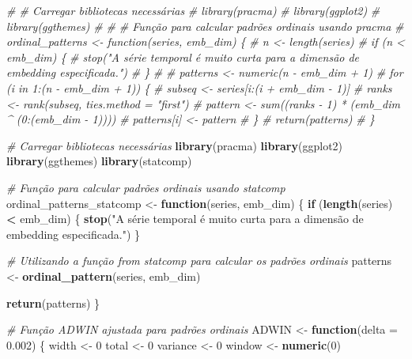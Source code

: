 \documentclass[
]{article}
\newenvironment{Shaded}{\begin{snugshade}}{\end{snugshade}}
\newcommand{\AttributeTok}[1]{\textcolor[rgb]{0.13,0.29,0.53}{#1}}
\newcommand{\CommentTok}[1]{\textcolor[rgb]{0.56,0.35,0.01}{\textit{#1}}}
\newcommand{\ControlFlowTok}[1]{\textcolor[rgb]{0.13,0.29,0.53}{\textbf{#1}}}
\newcommand{\DecValTok}[1]{\textcolor[rgb]{0.00,0.00,0.81}{#1}}
\newcommand{\FloatTok}[1]{\textcolor[rgb]{0.00,0.00,0.81}{#1}}
\newcommand{\FunctionTok}[1]{\textcolor[rgb]{0.13,0.29,0.53}{\textbf{#1}}}
\newcommand{\NormalTok}[1]{#1}
\newcommand{\OtherTok}[1]{\textcolor[rgb]{0.56,0.35,0.01}{#1}}
\newcommand{\SpecialCharTok}[1]{\textcolor[rgb]{0.81,0.36,0.00}{\textbf{#1}}}
\newcommand{\StringTok}[1]{\textcolor[rgb]{0.31,0.60,0.02}{#1}}
\begin{document}
\begin{Shaded}
\begin{Highlighting}[]
\CommentTok{\# \# Carregar bibliotecas necessárias}
\CommentTok{\# library(pracma)}
\CommentTok{\# library(ggplot2)}
\CommentTok{\# library(ggthemes)}
\CommentTok{\# }
\CommentTok{\# \# Função para calcular padrões ordinais usando pracma}
\CommentTok{\# ordinal\_patterns \textless{}{-} function(series, emb\_dim) \{}
\CommentTok{\#   n \textless{}{-} length(series)}
\CommentTok{\#   if (n \textless{} emb\_dim) \{}
\CommentTok{\#     stop("A série temporal é muito curta para a dimensão de embedding especificada.")}
\CommentTok{\#   \}}
\CommentTok{\#   }
\CommentTok{\#   patterns \textless{}{-} numeric(n {-} emb\_dim + 1)}
\CommentTok{\#   for (i in 1:(n {-} emb\_dim + 1)) \{}
\CommentTok{\#     subseq \textless{}{-} series[i:(i + emb\_dim {-} 1)]}
\CommentTok{\#     ranks \textless{}{-} rank(subseq, ties.method = "first")}
\CommentTok{\#     pattern \textless{}{-} sum((ranks {-} 1) * (emb\_dim \^{} (0:(emb\_dim {-} 1))))}
\CommentTok{\#     patterns[i] \textless{}{-} pattern}
\CommentTok{\#   \}}
\CommentTok{\#   return(patterns)}
\CommentTok{\# \}}

\CommentTok{\# Carregar bibliotecas necessárias}
\FunctionTok{library}\NormalTok{(pracma)}
\FunctionTok{library}\NormalTok{(ggplot2)}
\FunctionTok{library}\NormalTok{(ggthemes)}
\FunctionTok{library}\NormalTok{(statcomp)}

\CommentTok{\# Função para calcular padrões ordinais usando statcomp}
\NormalTok{ordinal\_patterns\_statcomp }\OtherTok{\textless{}{-}} \ControlFlowTok{function}\NormalTok{(series, emb\_dim) \{}
  \ControlFlowTok{if}\NormalTok{ (}\FunctionTok{length}\NormalTok{(series) }\SpecialCharTok{\textless{}}\NormalTok{ emb\_dim) \{}
    \FunctionTok{stop}\NormalTok{(}\StringTok{"A série temporal é muito curta para a dimensão de embedding especificada."}\NormalTok{)}
\NormalTok{  \}}
  
  \CommentTok{\# Utilizando a função from \textasciigrave{}statcomp\textasciigrave{} para calcular os padrões ordinais}
\NormalTok{  patterns }\OtherTok{\textless{}{-}} \FunctionTok{ordinal\_pattern}\NormalTok{(series, emb\_dim)}
  
  \FunctionTok{return}\NormalTok{(patterns)}
\NormalTok{\}}

\CommentTok{\# Função ADWIN ajustada para padrões ordinais}
\NormalTok{ADWIN }\OtherTok{\textless{}{-}} \ControlFlowTok{function}\NormalTok{(}\AttributeTok{delta =} \FloatTok{0.002}\NormalTok{) \{}
\NormalTok{  width }\OtherTok{\textless{}{-}} \DecValTok{0}
\NormalTok{  total }\OtherTok{\textless{}{-}} \DecValTok{0}
\NormalTok{  variance }\OtherTok{\textless{}{-}} \DecValTok{0}
\NormalTok{  window }\OtherTok{\textless{}{-}} \FunctionTok{numeric}\NormalTok{(}\DecValTok{0}\NormalTok{)}
  

\end{Highlighting}
\end{Shaded}
\end{document}
